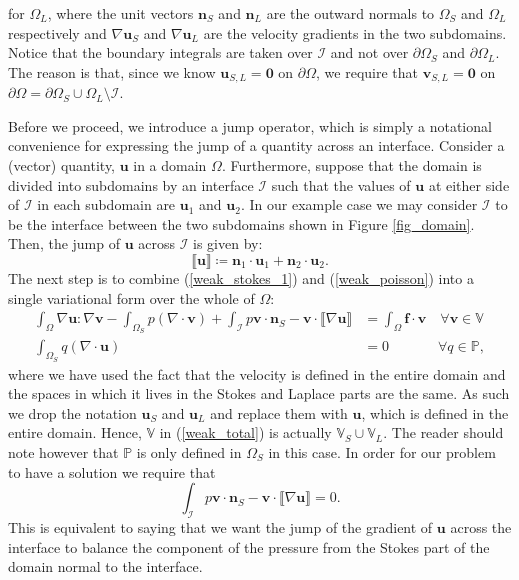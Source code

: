 \documentclass[12pt,a4paper]{article}
\theoremstyle{definition}
\begin{document}
for $\Omega_L$, where the unit vectors $\textbf{n}_S$ and $\textbf{n}_L$ are the outward normals to $\Omega_{S}$ and $\Omega_{L}$ respectively and $\nabla \textbf{u}_S$ and $\nabla \textbf{u}_L$ are the velocity gradients in the two subdomains. Notice that the boundary integrals are taken over $\mathcal{I}$ and not over $\partial \Omega_{S}$ and $\partial \Omega_{L}$.  The reason is that, since we know $\textbf{u}_{S,L}=\textbf{0}$ on $\partial \Omega$, we require that $\textbf{v}_{S,L}=\textbf{0}$ on $ \partial \Omega = \partial \Omega_S\cup \Omega_{L}\setminus \mathcal{I}$.   

Before we proceed, we introduce a jump operator, which is simply a notational convenience for expressing the jump of a quantity across an interface.  Consider a (vector) quantity, $\textbf{u}$ in a domain $\Omega$.   Furthermore, suppose that the domain is divided into subdomains by an interface $\mathcal{I}$ such that the values of $\textbf{u}$ at either side of $\mathcal{I}$ in each subdomain are $\textbf{u}_1$ and $\textbf{u}_2$. In our example case we may consider $\mathcal{I}$ to be the interface between the two subdomains shown in Figure \ref{fig_domain}.  Then, the jump of $\textbf{u}$ across $\mathcal{I}$ is given by:
\begin{equation}
\llbracket \textbf{u} \rrbracket \coloneqq \textbf{n}_1\cdot \textbf{u}_1+\textbf{n}_2\cdot  \textbf{u}_2.
\end{equation}
The next step is to combine (\ref{weak_stokes_1}) and (\ref{weak_poisson}) into a single variational form over the whole of $\Omega$:
\begin{equation}\label{weak_total}
\begin{aligned}
\int_{\Omega}\nabla \textbf{u} : \nabla \textbf{v}-\int_{\Omega_S}p\left(\nabla \cdot \textbf{v}\right) +\int_{\mathcal{I}} p\textbf{v}\cdot \textbf{n}_S-\textbf{v}\cdot\llbracket\nabla\textbf{u}\rrbracket &=\int_{\Omega}\textbf{f}\cdot \textbf{v} \quad \forall  \textbf{v}\in \mathbb{V}\\
\int_{\Omega_S}q\left(\nabla \cdot \textbf{u}\right) &= 0\quad\quad\,\,\,\quad \forall q\in \mathbb{P},
\end{aligned}
\end{equation}
where we have used the fact that the velocity is defined in the entire domain and the spaces in which it lives in the Stokes and Laplace parts are the same.  As such we drop the notation $\textbf{u}_S$ and $\textbf{u}_L$ and replace them with $\textbf{u}$, which is defined in the entire domain.  Hence, $\mathbb{V}$ in (\ref{weak_total}) is actually $\mathbb{V}_S\cup\mathbb{V}_L$.  The reader should note however that $\mathbb{P}$ is only defined in $\Omega_S$ in this case.
In order for our problem to have a solution we require that 
\begin{equation}\label{combi_cond_wellpos}
\int_{\mathcal{I}} p\textbf{v}\cdot \textbf{n}_S-\textbf{v}\cdot\llbracket\nabla\textbf{u}\rrbracket=0.
\end{equation}
This is equivalent to saying that we want the jump of the gradient of $\textbf{u}$ across the interface to balance the component of the pressure from the Stokes part of the domain normal to the interface.
\end{document}
